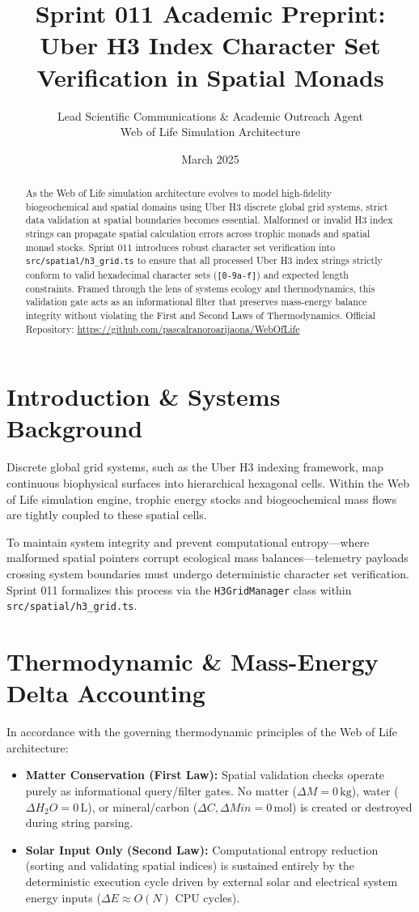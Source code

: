 \documentclass[11pt, a4paper]{article}
\title{Sprint 011 Academic Preprint: Uber H3 Index Character Set Verification in Spatial Monads}
\author{Lead Scientific Communications \& Academic Outreach Agent \\ Web of Life Simulation Architecture}
\date{March 2025}
\begin{document}
\maketitle

\begin{abstract}
As the Web of Life simulation architecture evolves to model high-fidelity biogeochemical and spatial domains using Uber H3 discrete global grid systems, strict data validation at spatial boundaries becomes essential. Malformed or invalid H3 index strings can propagate spatial calculation errors across trophic monads and spatial monad stocks. Sprint 011 introduces robust character set verification into \texttt{src/spatial/h3\_grid.ts} to ensure that all processed Uber H3 index strings strictly conform to valid hexadecimal character sets (\texttt{[0-9a-f]}) and expected length constraints. Framed through the lens of systems ecology and thermodynamics, this validation gate acts as an informational filter that preserves mass-energy balance integrity without violating the First and Second Laws of Thermodynamics. Official Repository: \url{https://github.com/pascalranoroarijaona/WebOfLife}
\end{abstract}

\section{Introduction \& Systems Background}
Discrete global grid systems, such as the Uber H3 indexing framework, map continuous biophysical surfaces into hierarchical hexagonal cells. Within the Web of Life simulation engine, trophic energy stocks and biogeochemical mass flows are tightly coupled to these spatial cells. 

To maintain system integrity and prevent computational entropy---where malformed spatial pointers corrupt ecological mass balances---telemetry payloads crossing system boundaries must undergo deterministic character set verification. Sprint 011 formalizes this process via the \texttt{H3GridManager} class within \texttt{src/spatial/h3\_grid.ts}.

\section{Thermodynamic \& Mass-Energy Delta Accounting}
In accordance with the governing thermodynamic principles of the Web of Life architecture:
\begin{itemize}
    \item \textbf{Matter Conservation (First Law):} Spatial validation checks operate purely as informational query/filter gates. No matter ($\Delta M = 0\,\text{kg}$), water ($\Delta H_2O = 0\,\text{L}$), or mineral/carbon ($\Delta C, \Delta Min = 0\,\text{mol}$) is created or destroyed during string parsing.
    \item \textbf{Solar Input Only (Second Law):} Computational entropy reduction (sorting and validating spatial indices) is sustained entirely by the deterministic execution cycle driven by external solar and electrical system energy inputs ($\Delta E \approx O(N)$ CPU cycles).
\end{itemize}
\end{document}
